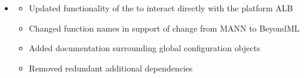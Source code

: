 \documentclass[letterpaper,10pt,english]{sphinxmanual}
\begin{document}
\begin{itemize}
\begin{description}
\begin{itemize}
\item {} 
\sphinxAtStartPar
Updated  class with parameters for  and 

\item {} 
\sphinxAtStartPar
Updated across\sphinxhyphen{}the\sphinxhyphen{}board functionality of the 

\end{itemize}

\end{description}

\item {} \begin{description}
\begin{itemize}
\item {} 
\sphinxAtStartPar
Updated functionality of the  to interact directly with the platform ALB

\item {} 
\sphinxAtStartPar
Changed function names in support of change from MANN to BeyondML

\item {} 
\sphinxAtStartPar
Added documentation surrounding global configuration objects

\item {} 
\sphinxAtStartPar
Removed redundant additional dependencies

\end{itemize}

\end{description}

\end{itemize}
\end{document}
